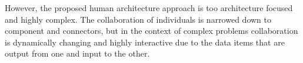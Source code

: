 However, the proposed human architecture approach is too architecture focused and 
highly complex. The collaboration of individuals is narrowed down to component 
and connectors, but in the context of complex problems collaboration is dynamically 
changing and highly interactive due to the data items that are output from one 
and input to the other. 